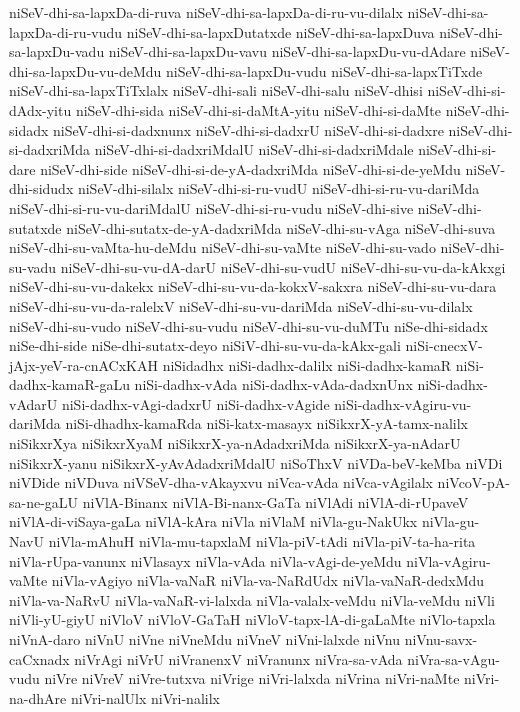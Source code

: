{niSeV-dhi-sa-lapxDa-di-ruva
niSeV-dhi-sa-lapxDa-di-ru-vu-dilalx
niSeV-dhi-sa-lapxDa-di-ru-vudu
niSeV-dhi-sa-lapxDutatxde
niSeV-dhi-sa-lapxDuva
niSeV-dhi-sa-lapxDu-vadu
niSeV-dhi-sa-lapxDu-vavu
niSeV-dhi-sa-lapxDu-vu-dAdare
niSeV-dhi-sa-lapxDu-vu-deMdu
niSeV-dhi-sa-lapxDu-vudu
niSeV-dhi-sa-lapxTiTxde
niSeV-dhi-sa-lapxTiTxlalx
niSeV-dhi-sali
niSeV-dhi-salu
niSeV-dhisi
niSeV-dhi-si-dAdx-yitu
niSeV-dhi-sida
niSeV-dhi-si-daMtA-yitu
niSeV-dhi-si-daMte
niSeV-dhi-sidadx
niSeV-dhi-si-dadxnunx
niSeV-dhi-si-dadxrU
niSeV-dhi-si-dadxre
niSeV-dhi-si-dadxriMda
niSeV-dhi-si-dadxriMdalU
niSeV-dhi-si-dadxriMdale
niSeV-dhi-si-dare
niSeV-dhi-side
niSeV-dhi-si-de-yA-dadxriMda
niSeV-dhi-si-de-yeMdu
niSeV-dhi-sidudx
niSeV-dhi-silalx
niSeV-dhi-si-ru-vudU
niSeV-dhi-si-ru-vu-dariMda
niSeV-dhi-si-ru-vu-dariMdalU
niSeV-dhi-si-ru-vudu
niSeV-dhi-sive
niSeV-dhi-sutatxde
niSeV-dhi-sutatx-de-yA-dadxriMda
niSeV-dhi-su-vAga
niSeV-dhi-suva
niSeV-dhi-su-vaMta-hu-deMdu
niSeV-dhi-su-vaMte
niSeV-dhi-su-vado
niSeV-dhi-su-vadu
niSeV-dhi-su-vu-dA-darU
niSeV-dhi-su-vudU
niSeV-dhi-su-vu-da-kAkxgi
niSeV-dhi-su-vu-dakekx
niSeV-dhi-su-vu-da-kokxV-sakxra
niSeV-dhi-su-vu-dara
niSeV-dhi-su-vu-da-ralelxV
niSeV-dhi-su-vu-dariMda
niSeV-dhi-su-vu-dilalx
niSeV-dhi-su-vudo
niSeV-dhi-su-vudu
niSeV-dhi-su-vu-duMTu
niSe-dhi-sidadx
niSe-dhi-side
niSe-dhi-sutatx-deyo
niSiV-dhi-su-vu-da-kAkx-gali
niSi-cnecxV-jAjx-yeV-ra-cnACxKAH
niSidadhx
niSi-dadhx-dalilx
niSi-dadhx-kamaR
niSi-dadhx-kamaR-gaLu
niSi-dadhx-vAda
niSi-dadhx-vAda-dadxnUnx
niSi-dadhx-vAdarU
niSi-dadhx-vAgi-dadxrU
niSi-dadhx-vAgide
niSi-dadhx-vAgiru-vu-dariMda
niSi-dhadhx-kamaRda
niSi-katx-masayx
niSikxrX-yA-tamx-nalilx
niSikxrXya
niSikxrXyaM
niSikxrX-ya-nAdadxriMda
niSikxrX-ya-nAdarU
niSikxrX-yanu
niSikxrX-yAvAdadxriMdalU
niSoThxV
niVDa-beV-keMba
niVDi
niVDide
niVDuva
niVSeV-dha-vAkayxvu
niVca-vAda
niVca-vAgilalx
niVcoV-pA-sa-ne-gaLU
niVlA-Binanx
niVlA-Bi-nanx-GaTa
niVlAdi
niVlA-di-rUpaveV
niVlA-di-viSaya-gaLa
niVlA-kAra
niVla
niVlaM
niVla-gu-NakUkx
niVla-gu-NavU
niVla-mAhuH
niVla-mu-tapxlaM
niVla-piV-tAdi
niVla-piV-ta-ha-rita
niVla-rUpa-vanunx
niVlasayx
niVla-vAda
niVla-vAgi-de-yeMdu
niVla-vAgiru-vaMte
niVla-vAgiyo
niVla-vaNaR
niVla-va-NaRdUdx
niVla-vaNaR-dedxMdu
niVla-va-NaRvU
niVla-vaNaR-vi-lalxda
niVla-valalx-veMdu
niVla-veMdu
niVli
niVli-yU-giyU
niVloV
niVloV-GaTaH
niVloV-tapx-lA-di-gaLaMte
niVlo-tapxla
niVnA-daro
niVnU
niVne
niVneMdu
niVneV
niVni-lalxde
niVnu
niVnu-savx-caCxnadx
niVrAgi
niVrU
niVranenxV
niVranunx
niVra-sa-vAda
niVra-sa-vAgu-vudu
niVre
niVreV
niVre-tutxva
niVrige
niVri-lalxda
niVrina
niVri-naMte
niVri-na-dhAre
niVri-nalUlx
niVri-nalilx
}
